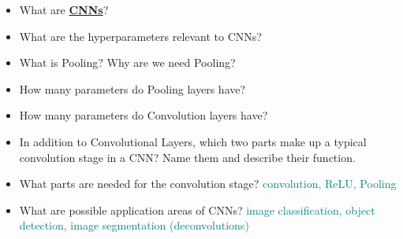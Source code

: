 \documentclass{report}
\newcommand{\asw}[2][teal]{}
\renewcommand{\asw}[2][teal]{\textcolor{#1}{#2}}
\begin{document}
\begin{itemize}
		\item What are \textbf{\underline{CNNs}}?
		\asw{\newline }
		\item What are the hyperparameters relevant to CNNs?
		\asw{\newline }
		\item What is Pooling? Why are we need Pooling?
		\asw{\newline }
		\item How many parameters do Pooling layers have?
		\asw{\newline }
		\item How many parameters do Convolution layers have?
		\asw{\newline }
		\item In addition to Convolutional Layers, which two parts make up a typical convolution stage in a CNN? Name them and describe their function.
		\asw{\newline }
		\item What parts are needed for the convolution stage?
		\asw{\newline convolution, ReLU, Pooling}
		\item What are possible application areas of CNNs?
		\asw{\newline image classification, object detection, image segmentation (deconvolutions)}
		

\end{itemize}
\end{document}
